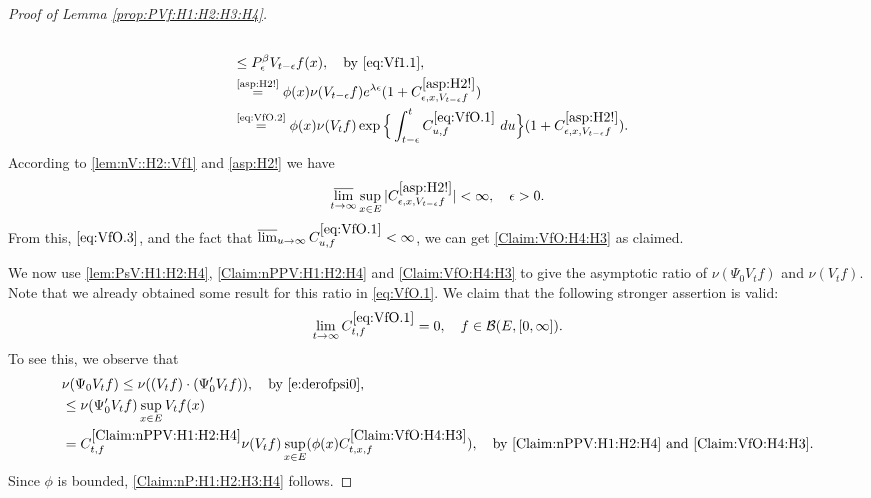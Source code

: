 \documentclass[12pt,a4paper]{amsart}
\numberwithin{equation}{section}
\theoremstyle{plain}
\theoremstyle{definition}
\theoremstyle{remark}
\begin{document}
\begin{proof}[Proof of Lemma \ref{prop:PVf:H1:H2:H3:H4}]
\begin{align}
	\\&\leq P_\epsilon^\beta V_{t-\epsilon} f(x),\quad\text{by \eqref{eq:Vf1.1}},
	\\& \overset{\text{\eqref{asp:H2!}}}= \phi(x) \nu(V_{t-\epsilon}f) e^{\lambda  \epsilon} (1+C_{\epsilon,x, V_{t-\epsilon} f}^{\eqref{asp:H2!}} )
	\\& \label{eq:VfO.3}\overset{\text{\eqref{eq:VfO.2}}}= \phi(x)\nu(V_{t}f)\exp\Big\{ \int_{t-\epsilon}^t C^{\eqref{eq:VfO.1}}_{u,f} ~du\Big\} (1+C_{\epsilon,x, V_{t-\epsilon} f}^{\eqref{asp:H2!}} ).
\end{align}
	According to \eqref{lem:nV::H2::Vf1}  and \eqref{asp:H2!} we have
\begin{equation}	
	\varlimsup_{t\to \infty}\sup_{x\in E} |C_{\epsilon,x, V_{t-\epsilon} f}^{\eqref{asp:H2!}}| < \infty, \quad \epsilon > 0.
\end{equation}
	From this, $\eqref{eq:VfO.3}$, and the fact that $\varlimsup_{u\to \infty} C^{\eqref{eq:VfO.1}}_{u,f}  < \infty$, we can get \eqref{Claim:VfO:H4:H3} as claimed.
	
	We now use \eqref{lem:PsV:H1:H2:H4}, \eqref{Claim:nPPV:H1:H2:H4} and \eqref{Claim:VfO:H4:H3} to give the asymptotic ratio of $\nu(\Psi_0V_tf)$ and $\nu(V_tf)$.
	Note that we already obtained some result for this ratio in \eqref{eq:VfO.1}.
	We claim that the following stronger assertion is valid:
\begin{equation}\label{Claim:nP:H1:H2:H3:H4}
	\lim_{t\to \infty}C^{\eqref{eq:VfO.1}}_{t,f} = 0, \quad f\in \mathcal B(E,[0,\infty]).
\end{equation}
	To see this, we observe that
\begin{align}
	&\nu(\Psi_0 V_tf)
	\leq \nu((V_tf)\cdot (\Psi_0' V_tf)) ,\quad\text{by \eqref{e:derofpsi0}},
	\\&  \leq  \nu(\Psi_0' V_tf) \sup_{x\in E}V_tf(x)
	\\& =   C^{\eqref{Claim:nPPV:H1:H2:H4}}_{t,f} \nu(V_tf) \sup_{x\in E} (\phi(x) C^{\eqref{Claim:VfO:H4:H3}}_{t,x,f}),\quad\text{by \eqref{Claim:nPPV:H1:H2:H4} and \eqref{Claim:VfO:H4:H3}}.
\end{align}
	Since $\phi$ is bounded, \eqref{Claim:nP:H1:H2:H3:H4} follows.
	

\end{proof}
\end{document}

